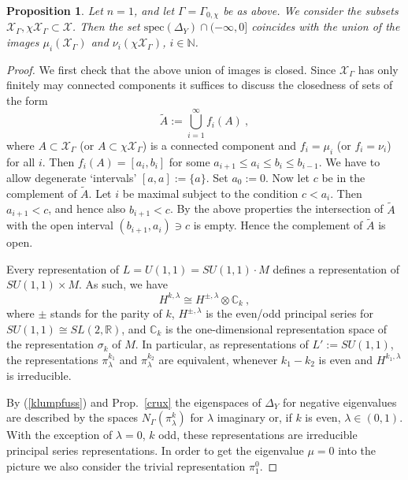 \documentclass[10]{amsart}
\newtheorem{pro}[thm]{Proposition}
\theoremstyle{remark}
\theoremstyle{definition}
\numberwithin{equation}{section}
\newcommand{\R}{\mathbb{R}}           %
\newcommand{\C}{\mathbb{C}}           %
\newcommand{\N}{\mathbb{N}}           %
\newcommand{\spec}{{\mathrm{spec}}}
\newcommand{\Cal}{\mathcal}
\newcommand{\be}{\begin{equation}}
\begin{document}
{\begin{pro}\label{nottoolate}
Let $n=1$, and let $\Gamma=\Gamma_{0,\chi}$ be as above. We consider the subsets ${\Cal X}_\Gamma, \chi {\Cal X}_\Gamma\subset {\Cal X}$. Then the set $\spec (\Delta_Y)\cap (-\infty,0]$ coincides with the union of the images $\mu_i({\Cal X}_\Gamma)$ and $\nu_i(\chi {\Cal X}_\Gamma)$, $i\in \N$.
\end{pro}
\begin{proof} 
We first check that the above union of images is closed. Since ${\Cal X}_\Gamma$ has only finitely may connected components it suffices to
discuss the closedness of sets of the form
$$ \tilde A:=\bigcup_{i=1}^\infty f_i(A)\ ,$$
where $A\subset {\Cal X}_\Gamma$ (or $A\subset \chi{\Cal X}_\Gamma$) is a connected component and $f_i=\mu_i$ (or $f_i=\nu_i$) for all $i$. Then  $f_i(A)=[a_i,b_i]$
for some $a_{i+1}\le a_i\le b_i\le b_{i-1}$. We have to allow degenerate `intervals' $[a,a]:=\{a\}$. Set $a_0:=0$. Now let $c$ be in the complement of $\tilde A$.
Let $i$ be maximal subject to the condition $c<a_i$. Then $a_{i+1}<c$, and hence also $b_{i+1}<c$. By the above properties the intersection of $\tilde A$ with the open interval 
$(b_{i+1}, a_i)\ni c$ is empty.
Hence the complement of $\tilde A$ is open.

Every representation of $L=U(1,1)=SU(1,1)\cdot M$  defines a representation of $SU(1,1)\times M$. As such, we have
\be\label{furunkel} 
H^{k,\lambda}\cong H^{\pm,\lambda}\otimes \C_k\ ,
\end{equation}
where $\pm$ stands for the parity of $k$, $H^{\pm,\lambda}$ is the even/odd principal series for $SU(1,1)\cong SL(2,\R)$,  and $\C_k$ is the one-dimensional representation space of the representation $\sigma_k$ of $M$.
In particular, as representations of $L':=SU(1,1)$, the representations $\pi_{\lambda}^{k_1}$ and $\pi_{\lambda}^{k_2}$ are equivalent, whenever $k_1-k_2$ is even and $H^{k_1,\lambda}$ is irreducible. 

By (\ref{klumpfuss}) and Prop.~\ref{crux} the eigenspaces of $\Delta_Y$ for negative eigenvalues are described by the spaces $N_\Gamma(\pi^k_\lambda)$ for $\lambda$ imaginary or,
if $k$ is even, $\lambda\in (0,1)$. With the exception of $\lambda=0$, $k$ odd, these representations are irreducible principal series representations. In order to get the eigenvalue
$\mu=0$ into the picture we also consider the trivial representation $\pi^0_1$.


\end{proof}}
\end{document}
